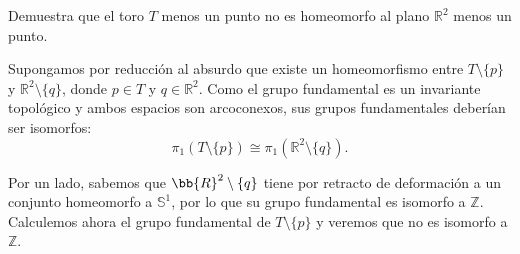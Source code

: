 \documentclass[12pt]{article}
\begin{document}
    \begin{ejercicio}
        Demuestra que el toro $T$ menos un punto no es homeomorfo al plano $\mathbb{R}^2$ menos un punto.\\


        Supongamos por reducción al absurdo que existe un homeomorfismo entre $T \setminus \{p\}$ y $\mathbb{R}^2 \setminus \{q\}$, donde $p \in T$ y $q \in \mathbb{R}^2$. Como el grupo fundamental es un invariante topológico y ambos espacios son arcoconexos, sus grupos fundamentales deberían ser isomorfos:
        \[
        \pi_1(T \setminus \{p\}) \cong \pi_1(\mathbb{R}^2 \setminus \{q\}).
        \]

        Por un lado, sabemos que $\bb{R}^2 \setminus \{q\}$ tiene por retracto de deformación a un conjunto homeomorfo a $\mathbb{S}^1$, por lo que su grupo fundamental es isomorfo a $\mathbb{Z}$. Calculemos ahora el grupo fundamental de $T \setminus \{p\}$ y veremos que no es isomorfo a $\mathbb{Z}$.\\
        


\end{ejercicio}
\end{document}
